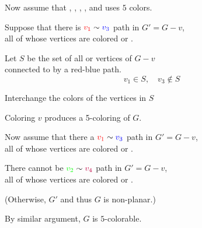 \begin{frame}{}
  \begin{center}
    Now assume that , , ,
    , and  uses $5$ colors.

    \pause
    \vspace{0.30cm}
    Suppose that there is  $\textcolor{red}{v_{1}} \sim \textcolor{blue}{v_{3}}$ path in $G' = G - v$, \\
    all of whose vertices are colored  or .

    \pause
    \vspace{0.30cm}
    Let $S$ be the set of all  or  vertices of $G - v$ \\
    connected to  by a red-blue path.
    \pause
    \[
      v_{1} \in S,\quad v_{3} \notin S
    \]

    \pause
    Interchange the colors of the vertices in $S$

    \pause
    \vspace{0.30cm}
    Coloring $v$  produces a 5-coloring of $G$.
  \end{center}
\end{frame}

\begin{frame}{}
  \begin{center}
    Now assume that there  a $\textcolor{red}{v_{1}} \sim \textcolor{blue}{v_{3}}$ path in $G' = G - v$, \\
    all of whose vertices are colored  or .

    \pause
    \vspace{0.30cm}
    There cannot be $\textcolor{green}{v_{2}} \sim \textcolor{purple}{v_{4}}$ path in $G' = G - v$, \\
    all of whose vertices are colored  or .

    \pause
    \vspace{0.20cm}
    (Otherwise, $G'$ and thus $G$ is non-planar.)

    \pause
    \vspace{0.50cm}
    By similar argument, $G$ is $5$-colorable.
  \end{center}
\end{frame}
